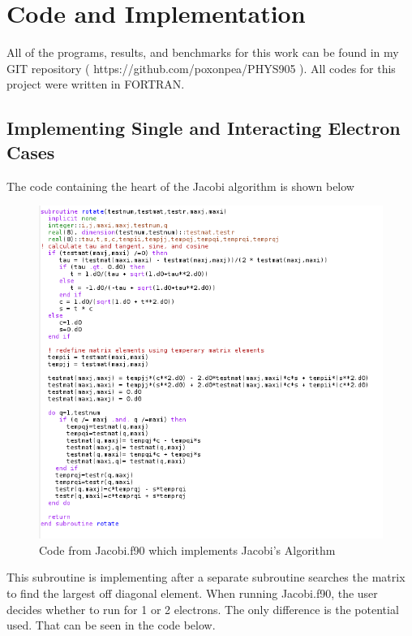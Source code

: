 \documentclass[%
oneside,                 %
final,                   %
10pt]{article}
\begin{document}
\section{Code and Implementation}

All of the programs, results, and benchmarks for this work can be found in my GIT repository ( https://github.com/poxonpea/PHYS905 ).  All codes for this project were written in FORTRAN.

\subsection{Implementing Single and Interacting Electron Cases}

The code containing the heart of the Jacobi algorithm is shown below

\begin{figure}[H]\label{fig:Jacobi}
  \centering
    \includegraphics[width=1.2\textwidth]{Rotate.PNG}
    \caption{Code from Jacobi.f90 which implements Jacobi's Algorithm}
\end{figure}

This subroutine is implementing after a separate subroutine searches the matrix to find the largest off diagonal element.  When running Jacobi.f90, the user decides whether to run for 1 or 2 electrons.  The only difference is the potential used.  That can be seen in the code below.
\end{document}
